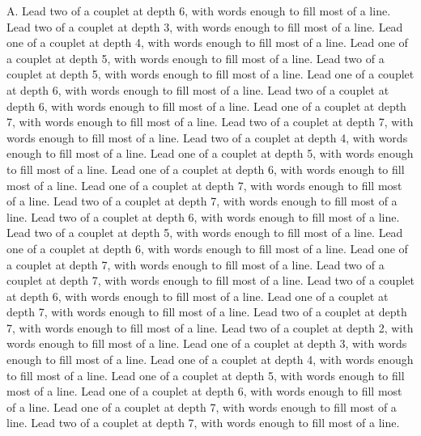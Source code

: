 \documentclass[a4paper]{article}
\begin{document}
\begin{Key}{A. }
\alter Lead two of a couplet at depth 6, with words enough to fill most of a line.
\alter Lead two of a couplet at depth 3, with words enough to fill most of a line.
\alter Lead one of a couplet at depth 4, with words enough to fill most of a line.
\alter Lead one of a couplet at depth 5, with words enough to fill most of a line.
\alter Lead two of a couplet at depth 5, with words enough to fill most of a line.
\alter Lead one of a couplet at depth 6, with words enough to fill most of a line.
\alter Lead two of a couplet at depth 6, with words enough to fill most of a line.
\alter Lead one of a couplet at depth 7, with words enough to fill most of a line.
\alter Lead two of a couplet at depth 7, with words enough to fill most of a line.
\alter Lead two of a couplet at depth 4, with words enough to fill most of a line.
\alter Lead one of a couplet at depth 5, with words enough to fill most of a line.
\alter Lead one of a couplet at depth 6, with words enough to fill most of a line.
\alter Lead one of a couplet at depth 7, with words enough to fill most of a line.
\alter Lead two of a couplet at depth 7, with words enough to fill most of a line.
\alter Lead two of a couplet at depth 6, with words enough to fill most of a line.
\alter Lead two of a couplet at depth 5, with words enough to fill most of a line.
\alter Lead one of a couplet at depth 6, with words enough to fill most of a line.
\alter Lead one of a couplet at depth 7, with words enough to fill most of a line.
\alter Lead two of a couplet at depth 7, with words enough to fill most of a line.
\alter Lead two of a couplet at depth 6, with words enough to fill most of a line.
\alter Lead one of a couplet at depth 7, with words enough to fill most of a line.
\alter Lead two of a couplet at depth 7, with words enough to fill most of a line.
\alter Lead two of a couplet at depth 2, with words enough to fill most of a line.
\alter Lead one of a couplet at depth 3, with words enough to fill most of a line.
\alter Lead one of a couplet at depth 4, with words enough to fill most of a line.
\alter Lead one of a couplet at depth 5, with words enough to fill most of a line.
\alter Lead one of a couplet at depth 6, with words enough to fill most of a line.
\alter Lead one of a couplet at depth 7, with words enough to fill most of a line.
\alter Lead two of a couplet at depth 7, with words enough to fill most of a line.

\end{Key}
\end{document}
